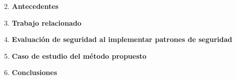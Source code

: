 \begin{enumerate}[label=Capítulo \arabic*,leftmargin=*]
	\setcounter{enumi}{1}
	\item \textbf{Antecedentes}
	
		\vspace{0.3cm}
	
	\item \textbf{Trabajo relacionado}
	
	\vspace{0.3cm}
	
		  
		\item \textbf{Evaluación de seguridad al implementar patrones de seguridad}
		
		\item \textbf{Caso de estudio del método propuesto}
		
		\item \textbf{Conclusiones}
		
		
\end{enumerate}
